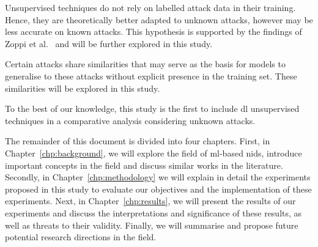 \begin{center}
\end{center}

Unsupervised techniques do not rely on labelled attack data in their training.
Hence, they are theoretically better adapted to unknown attacks, however may be
less accurate on known attacks. This hypothesis is supported by the findings of
Zoppi et al.~\cite{Zoppi} and will be further explored in this study.

\begin{center}
\end{center}

Certain attacks share similarities that may serve as the basis for models to
generalise to these attacks without explicit presence in the training set.
These similarities will be explored in this study.

To the best of our knowledge, this study is the first to include \gls{dl}
unsupervised techniques in a comparative analysis considering unknown attacks.

The remainder of this document is divided into four chapters. First, in
Chapter~\ref{chp:background}, we will explore the field of \gls{ml}-based
\gls{nids}, introduce important concepts in the field and discuss similar works
in the literature. Secondly, in Chapter~\ref{chp:methodology} we will explain
in detail the experiments proposed in this study to evaluate our objectives and
the implementation of these experiments. Next, in Chapter~\ref{chp:results}, we
will present the results of our experiments and discuss the interpretations and
significance of these results, as well as threats to their validity. Finally,
we will summarise and propose future potential research directions in the
field.